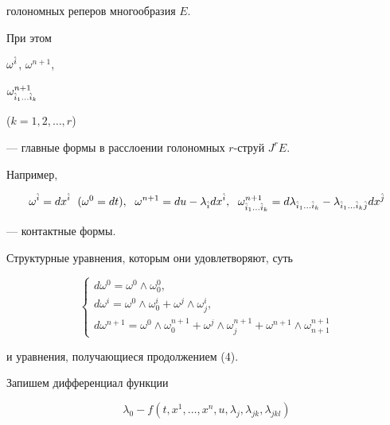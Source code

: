 голономных реперов многообразия $E$.


При этом


${\omega }^{\Hat i}$, ${\omega }^{n+1}$,


${\omega }^{n+1}_{{\Hat i}_1\dotsc{\Hat i}_k}$


($k=1,2,\dotsc,r$)


--- главные формы в расслоении голономных $r$-струй $J^rE$.


Например,


$$


\omega^{\Hat{i}}=dx^{\Hat{i}}\ \; (\omega^0=dt),\ \;


\omega^{n+1}=du-\lambda_{\Hat{i}}dx^{\Hat{i}}, \ \;


\omega^{n+1}_{\Hat{i}_1\dotsc\Hat{i}_k}=


d\lambda_{\Hat{i}_1\dotsc\Hat{i}_k}-


\lambda_{\Hat{i}_1\dotsc\Hat{i}_k\Hat{j}}dx^{\Hat{j}}


$$


--- контактные формы.





Структурные уравнения, которым они удовлетворяют, суть


\begin{equation}


\begin{cases}


d\omega^0=\omega^0\wedge\omega^0_0, \\


d\omega^i=\omega^0\wedge\omega^i_0+\omega^j\wedge\omega^i_j,\\


d\omega^{n+1}=\omega^0\wedge\omega^{n+1}_0+\omega^j\wedge


\omega^{n+1}_j+\omega^{n+1}\wedge\omega^{n+1}_{n+1}


\end{cases}


\end{equation}


и уравнения, получающиеся продолжением (4).





Запишем дифференциал функции


$$


{\lambda_0}-f(t,x^1,\dotsc,x^n,u,{\lambda_j},


{\lambda_{jk}},{\lambda_{jkl}})


$$


